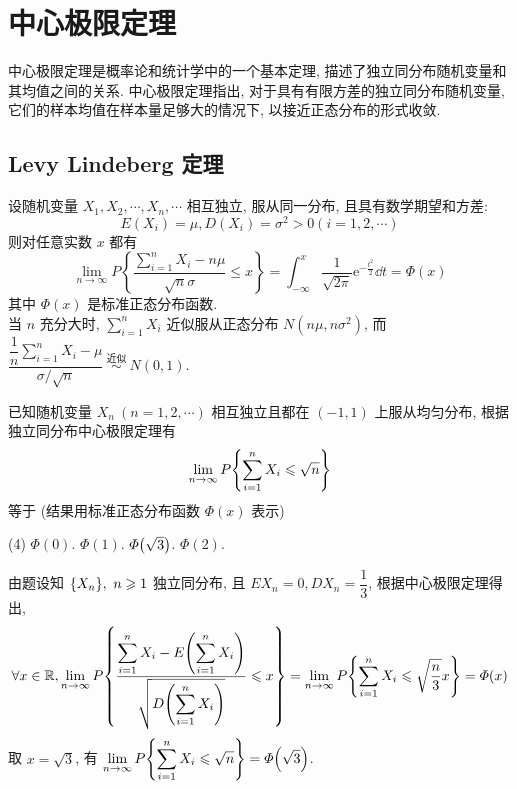 \section{中心极限定理}

中心极限定理是概率论和统计学中的一个基本定理, 描述了独立同分布随机变量和其均值之间的关系. 中心极限定理指出, 对于具有有限方差的独立同分布随机变量, 它们的样本均值在样本量足够大的情况下, 以接近正态分布的形式收敛. 

\subsection{Levy Lindeberg 定理}

\begin{theorem}
    设随机变量 $ X_{1}, X_{2}, \cdots, X_{n}, \cdots $ 相互独立, 服从同一分布, 且具有数学期望和方差:
    $$E\left(X_{i}\right)=\mu, D\left(X_{i}\right)=\sigma^{2}>0(i=1,2, \cdots)$$
    则对任意实数 $ x $ 都有
    $$\lim _{n \rightarrow \infty} P\left\{\frac{\sum_{i=1}^{n} X_{i}-n \mu}{\sqrt{n} \sigma} \leqslant x\right\}=\int_{-\infty}^{x} \frac{1}{\sqrt{2 \pi}} \mathrm{e}^{-\frac{t^{2}}{2}}\dd t=\varPhi(x)$$
    其中 $ \varPhi(x) $ 是标准正态分布函数.\\
    当 $ n $ 充分大时, 
    $\displaystyle \sum_{i=1}^{n} X_{i} \text { 近似服从正态分布 } N\left(n \mu, n \sigma^{2}\right) $, 
    而 $\dfrac{\displaystyle \dfrac{1}{n}\sum_{i=1}^{n} X_{i}-\mu}{\sigma / \sqrt{n}} \stackrel{\text { 近似 }}{\sim} N(0,1) .$
\end{theorem}

\begin{example}
    已知随机变量 $X_n~(n=1,2, \cdots )$ 相互独立且都在 $(-1,1)$ 上服从均匀分布, 根据独立同分布中心极限定理有 $$
    \lim_{n \to \infty}P\qty{\sum_{i=1}^{n} X_i\leqslant \sqrt{n}}
    $$
    等于 (结果用标准正态分布函数 $\varPhi(x)$ 表示)
    \begin{tasks}(4)
        \task $\varPhi(0)$.
        \task $\varPhi(1)$.
        \task $\varPhi\qty(\sqrt{3})$.
        \task $\varPhi(2)$.
    \end{tasks}
\end{example}
\begin{solution}
    由题设知 $\qty{X_n},~n\geqslant 1$ 独立同分布, 且 $EX_n=0,DX_n=\dfrac{1}{3}$, 
    根据中心极限定理得出, 
    $$
    \forall x\in \mathbb{R},\lim_{n \to \infty}P\qty{\dfrac{\displaystyle \sum_{i=1}^{n} X_i-E\qty(\sum_{i=1}^{n} X_i)}{\sqrt{D\qty(\displaystyle \sum_{i=1}^{n} X_i)}}\leqslant x}=\lim_{n \to \infty}P\qty{\sum_{i=1}^{n} X_i\leqslant \sqrt{\dfrac{n}{3}}x}=\varPhi(x)
    $$
    取 $x=\sqrt{3}$, 有 $ \displaystyle \lim_{n \to \infty}P\qty{\sum_{i=1}^{n} X_i\leqslant \sqrt{n}} =\varPhi\qty(\sqrt{3})$.
\end{solution}


